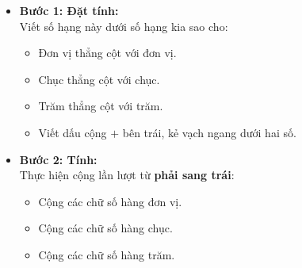 \documentclass[10pt,a4paper]{article}
\begin{document}
\noindent
\begin{minipage}[t]{0.49\textwidth}\vspace{0pt}
\begin{tcolorbox}[
  enhanced,
  colback=violet!4!white,
  colframe=violet!75!black,
  arc=2mm, boxrule=0.8pt,
  left=2mm, right=2mm, top=1.8mm, bottom=1.8mm,
  title={\footnotesize\bfseries\color{white}\faKey\ 1. Quy tắc đặt tính và tính}
]
{\footnotesize
\begin{itemize}\setlength{\itemsep}{1pt}\setlength{\leftskip}{-2.5mm}
  \item \textbf{Bước 1: Đặt tính:}\\
  Viết số hạng này dưới số hạng kia sao cho:
  \begin{itemize}\setlength{\itemsep}{0.5pt}\setlength{\leftskip}{-2mm}
    \item Đơn vị thẳng cột với đơn vị.
    \item Chục thẳng cột với chục.
    \item Trăm thẳng cột với trăm.
    \item Viết dấu cộng $+$ bên trái, kẻ vạch ngang dưới hai số.
  \end{itemize}
  \item \textbf{Bước 2: Tính:}\\
  Thực hiện cộng lần lượt từ \textbf{phải sang trái}:
  \begin{itemize}\setlength{\itemsep}{0.5pt}\setlength{\leftskip}{-2mm}
    \item Cộng các chữ số hàng đơn vị.
    \item Cộng các chữ số hàng chục.
    \item Cộng các chữ số hàng trăm.
  \end{itemize}
\end{itemize}
}
\end{tcolorbox}
\end{minipage}
\hfill
\end{document}
